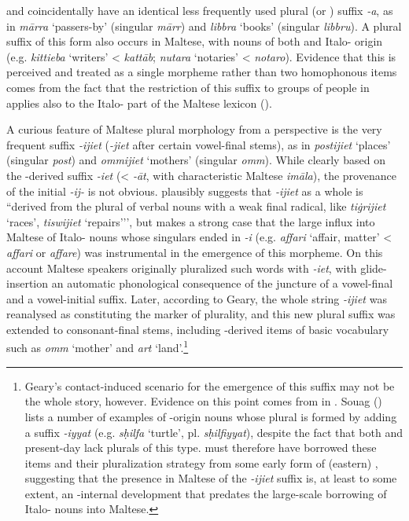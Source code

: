 \documentclass[output=paper]{langsci/langscibook}
\begin{document}
 and  coincidentally have an identical less frequently used plural (or ) suffix \textit{-a}, as in  \textit{m\={a}rra} `passers-by' (singular \textit{m\={a}rr}) and  \textit{libbra} `books' (singular \textit{libbru}). A plural suffix of this form also occurs in Maltese, with nouns of both  and Italo- origin (e.g. \textit{kittieba} `writers' <  \textit{katt\={a}b}; \textit{nutara} `notaries' <  \textit{notaro}). Evidence that this is perceived and treated as a single morpheme rather than two homophonous items comes from the fact that the restriction of this suffix to groups of people in  applies also to the Italo- part of the Maltese lexicon (\citealt{mifsud2011}).

A curious feature of Maltese plural morphology from a   perspective is the very frequent suffix \textit{-ijiet} (\textit{-jiet} after certain vowel-final stems), as in \textit{postijiet} `places' (singular \textit{post}) and \textit{ommijiet} `mothers' (singular \textit{omm}). While clearly based on the -derived suffix \textit{-iet} (<  \textit{-\={a}t}, with characteristic Maltese \textit{im\={a}la}), the provenance of the initial \textit{-ij-} is not obvious. \cite{mifsud2011} plausibly suggests that \textit{-ijiet} as a whole is ``derived from the plural of verbal nouns with a weak final radical, like \textit{tiġrijiet} `races', \textit{tiswijiet} `repairs’'', but \cite{geary2017} makes a strong case that the large influx into Maltese of Italo- nouns whose singulars ended in \textit{-i} (e.g. \textit{affari} `affair, matter' <  \textit{affari} or  \textit{affare}) was instrumental in the emergence of this morpheme. On this account Maltese speakers originally pluralized such words with \textit{-iet}, with glide-insertion an automatic phonological consequence of the juncture of a vowel-final  and a vowel-initial suffix. Later, according to Geary, the whole string \textit{-ijiet} was reanalysed as constituting the marker of plurality, and this new plural suffix was extended to consonant-final stems, including -derived items of basic vocabulary such as \textit{omm} `mother' and \textit{art} `land'.\footnote{Geary's contact-induced scenario for the emergence of this suffix may not be the whole story, however. Evidence on this point comes from   in  . Souag (\citeyear[74]{Souag2013book}) lists a number of examples of -origin nouns whose plural is formed by adding a suffix \textit{-iyyat} (e.g. \textit{sḥilfa} `turtle', pl. \textit{sḥilfiyyat}), despite the fact that both   and present-day  lack plurals of this type.   must therefore have borrowed these items and their pluralization strategy from some early form of (eastern)  , suggesting that the presence in Maltese of the \textit{-ijiet} suffix is, at least to some extent, an -internal development that predates the large-scale borrowing of Italo- nouns into Maltese.} %
\end{document}
